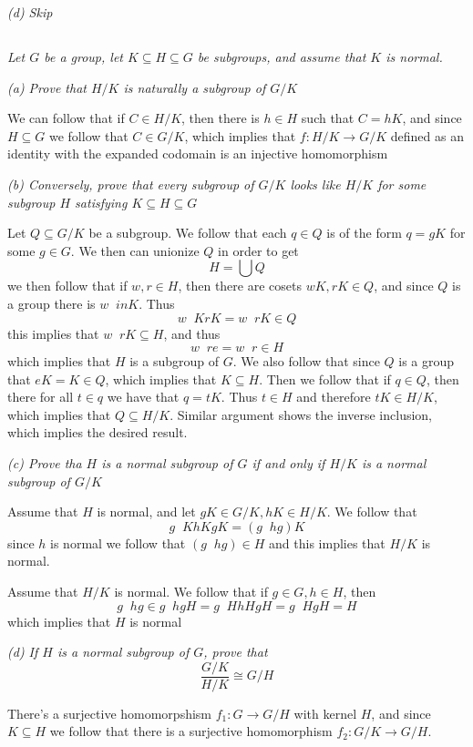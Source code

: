 \documentclass[11pt,oneside,titlepage]{book}
\DeclareMathOperator \inv {^{-1}}
\begin{document}
\textit{(d) Skip}

\subsection{}

\textit{Let $G$ be a group, let $K \subseteq H \subseteq G$ be
subgroups, and assume that $K$ is normal.}

\textit{(a) Prove that $H/K$ is naturally a subgroup of $G/K$}

We can follow that if $C \in H/K$, then there is $h \in H$ such that
$C = hK$, and since $H \subseteq G$ we follow that $C \in G/K$, which
implies that $f: H/K \to G/K$ defined as an identity with the expanded
codomain is an injective homomorphism

\textit{(b) Conversely, prove that every subgroup of $G/K$ looks like
$H/K$ for some subgroup $H$ satisfying $K \subseteq H \subseteq G$}

Let $Q \subseteq G/K$ be a subgroup. We follow that each $q \in Q$ is
of the form $q = gK$ for some $g \in G$.  We then can unionize $Q$ in
order to get
$$H = \bigcup Q$$
we then follow that if $w, r \in H$, then there are cosets $wK, rK \in
Q$, and since $Q$ is a group there is $w\inv in K$.  Thus
$$w\inv K r K = w\inv r K \in Q$$
this implies that $w\inv r K \subseteq H$, and thus
$$w\inv r e = w\inv r \in H$$
which implies that $H$ is a subgroup of $G$. We also follow that since
$Q$ is a group that $eK = K \in Q$, which implies that $K \subseteq
H$. Then we follow that if $q \in Q$, then there for all $t \in q$ we
have that $q = tK$. Thus $t \in H$ and therefore $tK \in H/K$, which
implies that $Q \subseteq H/K$. Similar argument shows the inverse
inclusion, which implies the desired result.

\textit{(c) Prove tha $H$ is a normal subgroup of $G$ if and only if
$H/K$ is a normal subgroup of $G/K$}

Assume that $H$ is normal, and let $gK \in G/K, hK \in H/K$. We follow
that
$$g\inv K h K g K = (g\inv h g) K$$
since $h$ is normal we follow that $(g\inv h g) \in H$ and this
implies that $H/K$ is normal.

Assume that $H/K$ is normal. We follow that if $g \in G, h \in H$,
then
$$g\inv h g \in g\inv h g H = g\inv H h H g H = g\inv H g H = H$$
which implies that $H$ is normal

\textit{(d) If $H$ is a normal subgroup of $G$, prove that
  $$\frac{G/K}{H/K} \cong G/H$$}

There's a surjective homomorpshism $f_1: G \to G/H$ with kernel $H$,
and since $K \subseteq H$ we follow that there is a surjective
homomorphism $f_2: G/K \to G/H$.
\end{document}
